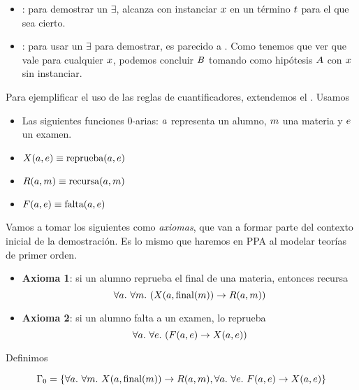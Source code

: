 \proofTreeExistsI
\proofTreeExistsE

\begin{itemize}
    \item {}: para demostrar un $\exists$, alcanza con instanciar $x$ en un término $t$ para el que sea cierto.
    \item {}: para usar un $\exists$ para demostrar, es parecido a . Como tenemos que ver que vale para cualquier $x$, podemos concluir $B$ tomando como hipótesis $A$ con $x$ sin instanciar. 
\end{itemize}

\begin{ejemplo}
    \label{nd:ex:exam-nd-lpo}
    Para ejemplificar el uso de las reglas de cuantificadores, extendemos el . Usamos

    \begin{itemize}
        \item Las siguientes funciones 0-arias: $a$ representa un
        alumno, $m$ una materia y $e$ un examen.
        \item $X(a, e) \equiv \textrm{reprueba}(a, e)$
        \item $R(a, m) \equiv \textrm{recursa}(a, m)$
        \item $F(a, e) \equiv \textrm{falta}(a, e)$
    \end{itemize}

    Vamos a tomar los siguientes como \textit{axiomas}, que van a formar parte del contexto inicial de la demostración. Es lo mismo que haremos en PPA al modelar teorías de primer orden.

    \begin{itemize}
        \item \textbf{Axioma 1}: si un alumno reprueba el final de una materia, entonces recursa
        \[
            \forall \vAlu .\ \forall \vMat .\
                (\reprueba(\vAlu, \funFinal(\vMat)) \fImp
                \recursa(\vAlu, \vMat))
        \]
        \item \textbf{Axioma 2}: si un alumno falta a un examen, lo reprueba
        \[
            \forall a .\ \forall e .\
                (F(a, e) \to X(a, e))
        \]
    \end{itemize}

    Definimos

    \[
        \Gamma_0 = \{
            \forall a .\ \forall m .\
                X(a, \textrm{final}(m)) \to
                R(a, m),
            \forall a .\ \forall e .\
                F(a, e) \to X(a, e)
        \}
    \]


\end{ejemplo}
